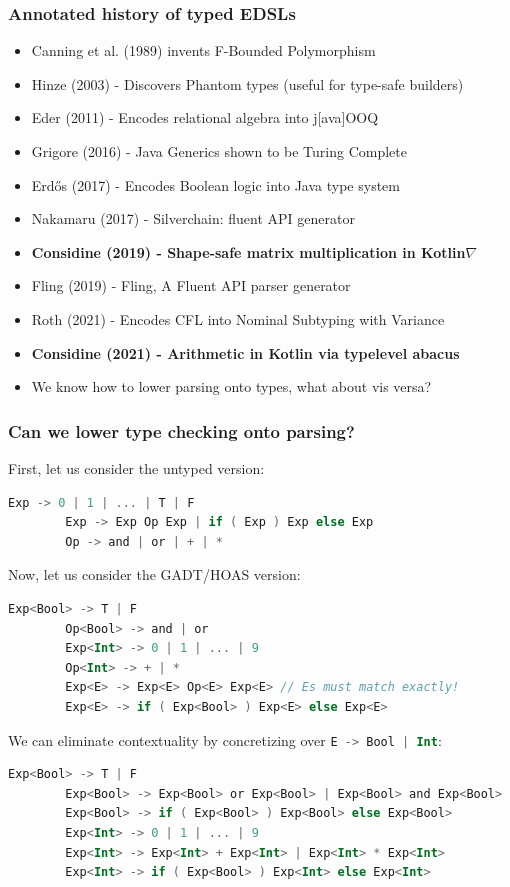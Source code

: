 \documentclass{beamer}
\begin{document}
\begin{frame}
    \begin{frame}
        \frametitle{Annotated history of typed EDSLs}
        \begin{itemize}
            \item Canning et al. (1989) invents F-Bounded Polymorphism
            \item Hinze (2003) - Discovers Phantom types (useful for type-safe builders)
            \item Eder (2011) - Encodes relational algebra into j[ava]OOQ
            \item Grigore (2016) - Java Generics shown to be Turing Complete
            \item Erdős (2017) - Encodes Boolean logic into Java type system
            \item Nakamaru (2017) - Silverchain: fluent API generator
            \item \textbf{Considine (2019) - Shape-safe matrix multiplication in Kotlin$\nabla$}
            \item Fling (2019) - Fling, A Fluent API parser generator
            \item Roth (2021) - Encodes CFL into Nominal Subtyping with Variance
            \item \textbf{Considine (2021) - Arithmetic in Kotlin via typelevel abacus}
            \item We know how to lower parsing onto types, what about vis versa?
        \end{itemize}
    \end{frame}

    \begin{frame}[fragile]
        \frametitle{Can we lower type checking onto parsing?}
        First, let us consider the untyped version:
        \begin{lstlisting}[language=Kotlin, gobble=5]
        Exp -> 0 | 1 | ... | T | F
        Exp -> Exp Op Exp | if ( Exp ) Exp else Exp
        Op -> and | or | + | *
        \end{lstlisting}
        Now, let us consider the GADT/HOAS version:
        \begin{lstlisting}[language=Kotlin, gobble=5]
        Exp<Bool> -> T | F
        Op<Bool> -> and | or
        Exp<Int> -> 0 | 1 | ... | 9
        Op<Int> -> + | *
        Exp<E> -> Exp<E> Op<E> Exp<E> // Es must match exactly!
        Exp<E> -> if ( Exp<Bool> ) Exp<E> else Exp<E>
        \end{lstlisting}
        We can eliminate contextuality by concretizing over \lstinline[language=Kotlin]{E -> Bool | Int}:
        \begin{lstlisting}[language=Kotlin, gobble=5]
        Exp<Bool> -> T | F
        Exp<Bool> -> Exp<Bool> or Exp<Bool> | Exp<Bool> and Exp<Bool>
        Exp<Bool> -> if ( Exp<Bool> ) Exp<Bool> else Exp<Bool>
        Exp<Int> -> 0 | 1 | ... | 9
        Exp<Int> -> Exp<Int> + Exp<Int> | Exp<Int> * Exp<Int>
        Exp<Int> -> if ( Exp<Bool> ) Exp<Int> else Exp<Int>
        \end{lstlisting}


\end{frame}
\end{frame}
\end{document}
